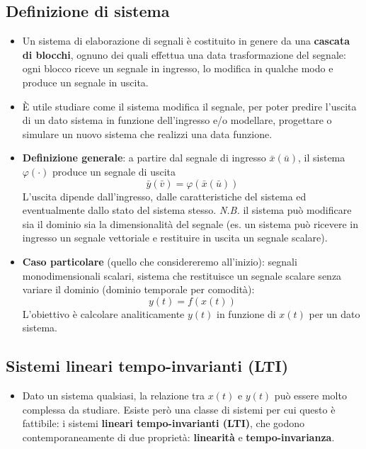 \documentclass[12pt, a4paper]{article}
\begin{document}
\subsection{Definizione di sistema}
\begin{itemize}
    \item Un sistema di elaborazione di segnali è costituito in genere da una \textbf{cascata di blocchi}, ognuno dei quali effettua una data trasformazione del segnale: ogni blocco riceve un segnale in ingresso, lo modifica in qualche modo e produce un segnale in uscita.
    \item È utile studiare come il sistema modifica il segnale, per poter predire l'uscita di un dato sistema in funzione dell'ingresso e/o modellare, progettare o simulare un nuovo sistema che realizzi una data funzione.
    \item \textbf{Definizione generale}: a partire dal segnale di ingresso $\bar x(\bar u)$, il sistema $\varphi(\cdot)$ produce un segnale di uscita
    $$\bar y(\bar v) = \varphi(\bar x(\bar u))$$
    L'uscita dipende dall'ingresso, dalle caratteristiche del sistema ed eventualmente dallo stato del sistema stesso. \textit{N.B.} il sistema può modificare sia il dominio sia la dimensionalità del segnale (es. un sistema può ricevere in ingresso un segnale vettoriale e restituire in uscita un segnale scalare).
    \item \textbf{Caso particolare} (quello che considereremo all'inizio): segnali monodimensionali scalari, sistema che restituisce un segnale scalare senza variare il dominio (dominio temporale per comodità):
    $$y(t) = f(x(t))$$
    L'obiettivo è calcolare analiticamente $y(t)$ in funzione di $x(t)$ per un dato sistema.
\end{itemize}

\subsection{Sistemi lineari tempo-invarianti (LTI)}
\begin{itemize}
    \item Dato un sistema qualsiasi, la relazione tra $x(t)$ e $y(t)$ può essere molto complessa da studiare. Esiste però una classe di sistemi per cui questo è fattibile: i sistemi \textbf{lineari tempo-invarianti (LTI)}, che godono contemporaneamente di due proprietà: \textbf{linearità} e \textbf{tempo-invarianza}.
\end{itemize}
\end{document}
